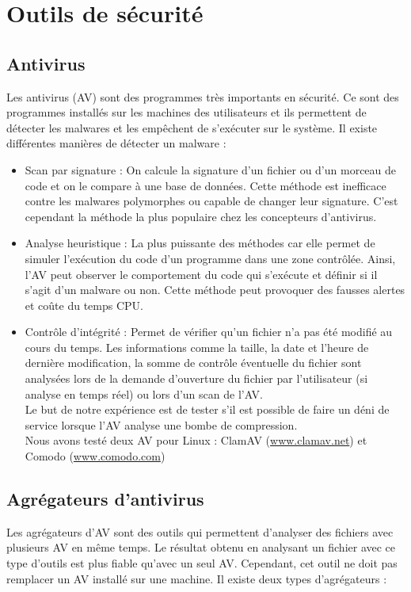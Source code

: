 \documentclass[smallextended]{svjour3}       %
\begin{document}
\section{Outils de sécurité}
\label{2.Outils}

\subsection{Antivirus}
\label{2.1antivirus}
Les antivirus (AV) sont des programmes très importants en sécurité. Ce sont des programmes installés sur les machines des utilisateurs et ils permettent de détecter les malwares et les empêchent de s’exécuter sur le système. Il existe différentes manières de détecter un malware : 
\begin{itemize}
\item Scan par signature : On calcule la signature d'un fichier ou d'un morceau de code et on le compare à une base de données. Cette méthode est inefficace contre les malwares polymorphes ou capable de changer leur signature. C'est cependant la méthode la plus populaire chez les concepteurs d'antivirus.
\item Analyse heuristique : La plus puissante des méthodes car elle permet de simuler l’exécution du code d'un programme dans une zone contrôlée. Ainsi, l'AV peut observer le comportement du code qui s’exécute et définir si il s'agit d'un malware ou non. Cette méthode peut provoquer des fausses alertes et coûte du temps CPU.
\item Contrôle d'intégrité : Permet de vérifier qu'un fichier n'a pas été modifié au cours du temps. Les informations comme la taille, la date et l'heure de dernière modification, la somme de contrôle éventuelle du fichier sont analysées lors de la demande d'ouverture du fichier par l'utilisateur (si analyse en temps réel) ou lors d'un scan de l'AV.\\
Le but de notre expérience est de tester s'il est possible de faire un déni de service lorsque l'AV analyse une bombe de compression.\\
Nous avons testé deux AV pour Linux : ClamAV (\url{www.clamav.net}) et Comodo (\url{www.comodo.com})\\
\end{itemize}

\subsection{Agrégateurs d'antivirus}
\label{2.2agrégateurs}
Les agrégateurs d'AV sont des outils qui permettent d'analyser des fichiers avec plusieurs AV en même temps. Le résultat obtenu en analysant un fichier avec ce type d'outils est plus fiable qu'avec un seul AV. Cependant, cet outil ne doit pas remplacer un AV installé sur une machine. Il existe deux types d’agrégateurs :  
\end{document}
